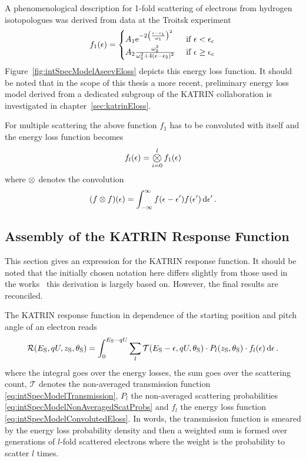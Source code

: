 A phenomenological description for 1-fold scattering of electrons from hydrogen isotopologues was derived from data at the Troitsk experiment~\cite{Aseev2000, Abdurashitov2017}
\begin{equation}
\label{eq:intSpecModelAseevEloss}
	f_1(\epsilon) =
	\begin{cases}
		A_1 
		\mathrm{e}^{ 
			-2\left(
			\frac{\epsilon-\epsilon_1}{\omega_1}
			\right)^2
		}
		&\text{ if } \epsilon < \epsilon_\mathrm{c} \\
		A_2\frac{
			\omega_2^2
		}{
			\omega_2^2+4(\epsilon-\epsilon_2)^2
		} 
		&\text{ if } \epsilon \geq \epsilon_\mathrm{c}
	\end{cases}
\end{equation}
Figure~\ref{fig:intSpecModelAseevEloss} depicts this energy loss function. It should be noted that in the scope of this thesis a more recent, preliminary energy loss model derived from a dedicated subgroup of the KATRIN collaboration is investigated in chapter~\ref{sec:katrinEloss}.

For multiple scattering the above function $f_1$ has to be convoluted with itself and the energy loss function becomes~\cite{Kleesiek2019}
\begin{equation}
	\label{eq:intSpecModelConvolutedEloss}
	f_l(\epsilon) = \Conv_{i=0}^{l} f_1(\epsilon)
\end{equation}
where $\otimes$ denotes the convolution
\begin{equation}
(f \otimes f)(\epsilon) = 
\int_{-\infty}^{\infty}  
	f(\epsilon-\epsilon^\prime)f(\epsilon^\prime)
\mathop{}\!\mathrm{d} \epsilon^\prime 
\text{\,.} 
\end{equation}

\subsection{Assembly of the KATRIN Response Function}
\label{sec:intSpecModelResponseReconciliation}
This section gives an expression for the KATRIN response function. It should be noted that the initially chosen notation here differs slightly from those used in the works~\cite{Groh2015,Kleesiek2019} this derivation is largely based on. However, the final results are reconciled.

The KATRIN response function in dependence of the starting position and pitch angle of an electron reads 
\begin{equation}
	\label{eq:intSpecModelNonAveragedResponse}
	\mathcal{R}(E_\mathrm{S}, qU, z_\mathrm{S}, \theta_\mathrm{S}) =
	\int_{0}^{E_\mathrm{S}-qU}
	\sum_{l}
	\mathcal{T}(E_\mathrm{S}-\epsilon, qU, \theta_\mathrm{S}) \cdot
	P_l(z_\mathrm{S}, \theta_\mathrm{S}) \cdot
	f_l(\epsilon)
	\mathop{}\!\mathrm{d} \epsilon
	\text{\,.}
\end{equation}
where the integral goes over the energy losses, the sum goes over the scattering count, $\mathcal{T}$ denotes the non-averaged transmission function \eqref{eq:intSpecModelTransmission}, $P_l$ the non-averaged scattering probabilities \eqref{eq:intSpecModelNonAveragedScatProbs} and $f_l$ the energy loss function \eqref{eq:intSpecModelConvolutedEloss}. In words, the transmission function is smeared by the energy loss probability density and then a weighted sum is formed over generations of $l$-fold scattered electrons where the weight is the probability to scatter $l$ times.

